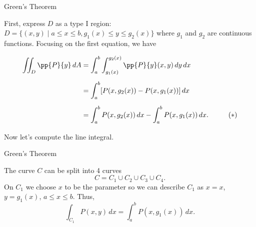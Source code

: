 \documentclass[11pt,english,
handout
]{beamer}
\begin{document}
\begin{frame}[t]{Green's Theorem}
\small
\begin{proofs}
First, express $D$ as a type I region: $D=\{(x,y)\mid a\leq x\leq b,g_1(x)\leq y\leq g_2(x)\}$ where $g_1$ and $g_2$ are continuous functions. \pause Focusing on the first equation, we have

\begin{align*}
\iint_D\pp{P}{y}\,dA&=\int_a^b\int_{g_1(x)}^{g_2(x)}\pp{P}{y}(x,y)\,dy\,dx\\[2mm]
&=\int_a^b[P(x,g_2(x))-P(x,g_1(x))]\,dx\\[2mm]
&=\int_a^bP(x,g_2(x))\,dx-\int_a^bP(x,g_1(x))\,dx.\hspace{10mm}(*)\\[2mm]
\end{align*}\pause
Now let's compute the line integral.
\end{proofs}
\end{frame}


















\begin{frame}[t]{Green's Theorem}
\small
\begin{proofs}

\vspace{3mm}
\begin{minipage}{0.5\textwidth}
The curve $C$ can be split into 4 curves
\[
C=C_1\cup C_2\cup C_3 \cup C_4.
\]
On $C_1$ we choose $x$ to be the parameter so we can describe $C_1$ as $x=x$, $y=g_1(x)$, $a\leq x\leq b$. Thus,
{\footnotesize\[
\int_{C_1}P(x,y)\,dx=\int_a^bP(x,g_1(x))\,dx.
\]}


\end{minipage}%
\begin{minipage}{0.5\textwidth}
\centering
{}
\end{minipage}

\vspace{3mm}
\end{proofs}
\end{frame}
\end{document}
